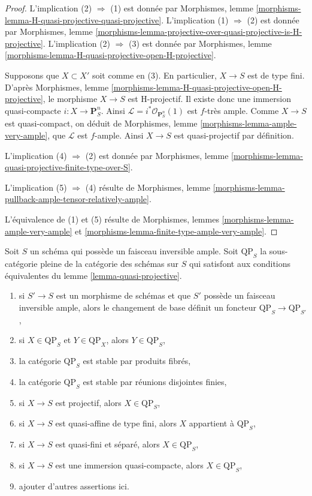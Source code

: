 \begin{proof}
L'implication (2) $\Rightarrow$ (1) est donnée par
Morphismes, lemme \ref{morphisms-lemma-H-quasi-projective-quasi-projective}.
L'implication (1) $\Rightarrow$ (2) est donnée par
Morphismes, lemme
\ref{morphisms-lemma-projective-over-quasi-projective-is-H-projective}.
L'implication (2) $\Rightarrow$ (3) est donnée par
Morphismes, lemme \ref{morphisms-lemma-H-quasi-projective-open-H-projective}.

\medskip\noindent
Supposons que $X \subset X'$ soit comme en (3). En particulier, $X \to S$ est
de type fini. D'après
Morphismes, lemme \ref{morphisms-lemma-H-quasi-projective-open-H-projective},
le morphisme $X \to S$ est H-projectif.
Il existe donc une immersion quasi-compacte $i : X \to \mathbf{P}^n_S$.
Ainsi $\mathcal{L} = i^*\mathcal{O}_{\mathbf{P}^n_S}(1)$
est $f$-très ample. Comme $X \to S$ est quasi-compact, on déduit de
Morphismes, lemme \ref{morphisms-lemma-ample-very-ample},
que $\mathcal{L}$ est $f$-ample. Ainsi $X \to S$ est quasi-projectif
par définition.

\medskip\noindent
L'implication (4) $\Rightarrow$ (2) est donnée par
Morphismes, lemme \ref{morphisms-lemma-quasi-projective-finite-type-over-S}.

\medskip\noindent
L'implication (5) $\Rightarrow$ (4) résulte de
Morphismes, lemme \ref{morphisms-lemma-pullback-ample-tensor-relatively-ample}.

\medskip\noindent
L'équivalence de (1) et (5) résulte de
Morphismes, lemmes \ref{morphisms-lemma-ample-very-ample} et
\ref{morphisms-lemma-finite-type-ample-very-ample}.
\end{proof}

\begin{lemma}
\label{lemma-category-quasi-projective}
Soit $S$ un schéma qui possède un faisceau inversible ample.
Soit $\text{QP}_S$ la sous-catégorie pleine de la
catégorie des schémas sur $S$ qui satisfont aux conditions
équivalentes du lemme \ref{lemma-quasi-projective}.
\begin{enumerate}
\item si $S' \to S$ est un morphisme de schémas et que $S'$ possède
un faisceau inversible ample, alors le changement de base définit
un foncteur $\text{QP}_S \to \text{QP}_{S'}$,
\item si $X \in \text{QP}_S$ et $Y \in \text{QP}_X$, alors $Y \in \text{QP}_S$,
\item la catégorie $\text{QP}_S$ est stable par produits fibrés,
\item la catégorie $\text{QP}_S$ est stable par
réunions disjointes finies,
\item si $X \to S$ est projectif, alors $X \in \text{QP}_S$,
\item si $X \to S$ est quasi-affine de type fini, alors
$X$ appartient à $\text{QP}_S$,
\item si $X \to S$ est quasi-fini et séparé, alors
$X \in \text{QP}_S$,
\item si $X \to S$ est une immersion quasi-compacte, alors
$X \in \text{QP}_S$,
\item ajouter d'autres assertions ici.
\end{enumerate}
\end{lemma}

